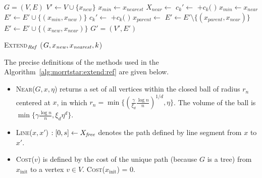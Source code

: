 \documentclass{article}
\begin{document}
\begin{algorithm}[hbtp]
\begin{algorithmic}[1]
	\Return $G=(V,E)$ 
\EndIf
\State $ V' \leftarrow V \cup \{ x_{new} \} $
\State $ x_{min} \leftarrow x_{nearest} $
\State $ X_{near} \leftarrow $ 
			\State $ c_{k}' \leftarrow $  $ + c_{k}( $  $ ) $ 
			\State $ x_{min} \leftarrow x_{near} $
			\EndIf
		\EndIf
	\EndFor
	\State $ E' \leftarrow E' \cup \{ ( x_{min}, x_{new} ) \} $
{}
	    \State $ c_{k}' \leftarrow $  $ + c_{k}( $  $ ) $ 
			\State $ x_{parent} \leftarrow $ 
			\State $ E' \leftarrow E' \setminus \{ ( x_{parent}, x_{near} ) \} $
			\State $ E' \leftarrow E' \cup \{ ( x_{new}, x_{near} ) \} $
		\EndIf
	\EndIf
\EndFor
\Return $ G' = (V', E') $ 
\end{algorithmic}
\caption{ \textsc{Extend}$_{\it Ref} $ ($ G, x_{\it new}, x_{\it nearest},k$) }
\label{alg:morrtstar:extend:ref}
\end{algorithm} 

The precise definitions of the methods used in the Algorithm~\ref{alg:morrtstar:extend:ref} are given below.
\begin{itemize}
	\item \textsc{Near}($ G, x, \eta $) returns a set of all vertices within the closed ball of radius $ r_{n} $ centered at $ x $, in which $ r_{n} = \min \{ ( \frac{\gamma}{\xi_{d}} \frac{\log n}{n} )^{1/d}  , \eta \} $.
	The volume of the ball is $ \min \{ \gamma \frac{\log n}{n} , \xi_{d} \eta^{d} \} $.
	\item \textsc{Line}($ x, x' $) $ : [0, s] \leftarrow X_{\it free} $ denotes the path defined by line segment from $x$ to $x'$.
	\item \textsc{Cost}($ v  $) is defined by the cost of the unique path (because $G$ is a tree) from $ x_{ \mbox{init} } $ to a vertex $ v \in V $. \textsc{Cost}($ x_{ \mbox{init} } $) = $ 0 $.
\end{itemize}
\end{document}
